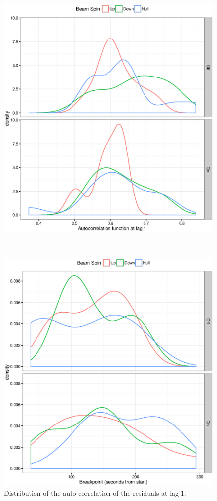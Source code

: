 \documentclass{article}
\begin{document}
\begin{figure}[h]
	\centering
	\begin{minipage}{.5\textwidth}
		\centering
		\includegraphics[scale=.5]{ACF1_dens.eps}
		\caption{Distribution of the auto-correlation of the residuals at lag 1.\label{fig:DW2}}
	\end{minipage}~~
	\begin{minipage}{.5\textwidth}
		\centering
		\includegraphics[scale=.5]{FStats_BP_dens.eps}

\end{minipage}
\end{figure}
\end{document}
